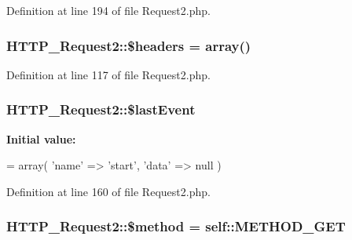 Definition at line 194 of file Request2.\-php.

\hypertarget{classHTTP__Request2_a0d70f1b39d77f1e8bca7cd984d25192e}{
\subsubsection[{\$headers}]{\setlength{\rightskip}{0pt plus 5cm}H\-T\-T\-P\-\_\-\-Request2\-::\$headers = array()\hspace{0.3cm}{\ttfamily [protected]}}}\label{classHTTP__Request2_a0d70f1b39d77f1e8bca7cd984d25192e}


Definition at line 117 of file Request2.\-php.

\hypertarget{classHTTP__Request2_a53a051d2cfcad3fc688b7974c996e750}{
\subsubsection[{\$last\-Event}]{\setlength{\rightskip}{0pt plus 5cm}H\-T\-T\-P\-\_\-\-Request2\-::\$last\-Event\hspace{0.3cm}{\ttfamily [protected]}}}\label{classHTTP__Request2_a53a051d2cfcad3fc688b7974c996e750}
{\bfseries Initial value\-:}
\begin{DoxyCode}
= array(
        \textcolor{stringliteral}{'name'} => \textcolor{stringliteral}{'start'},
        \textcolor{stringliteral}{'data'} => null
    )
\end{DoxyCode}


Definition at line 160 of file Request2.\-php.

\hypertarget{classHTTP__Request2_ae83c79d14f1b596d91b60862ea1370af}{
\subsubsection[{\$method}]{\setlength{\rightskip}{0pt plus 5cm}H\-T\-T\-P\-\_\-\-Request2\-::\$method = self\-::\-M\-E\-T\-H\-O\-D\-\_\-\-G\-E\-T\hspace{0.3cm}{\ttfamily [protected]}}}\label{classHTTP__Request2_ae83c79d14f1b596d91b60862ea1370af}


